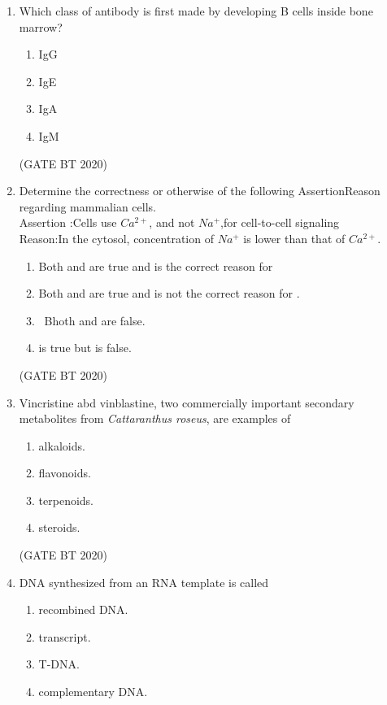 \documentclass[journal,12pt,onecolumn]{IEEEtran}
\theoremstyle{remark}
\begin{document}
\begin{enumerate}[label=Q\arabic*:]
\item Which class of antibody is first made by developing B cells inside bone marrow?
\begin{multicols}{4}
\begin{enumerate}
\item\;IgG
\item\;IgE
\item\;IgA
\item\;IgM
\end{enumerate}
\end{multicols}
\hfill(GATE BT 2020)

\item Determine the correctness or otherwise of the following AssertionReason regarding mammalian cells.\\
Assertion :Cells use $Ca^{2+}$, and not $Na^{+}$,for cell-to-cell signaling\\
Reason:In the cytosol, concentration of $Na^{+}$ is lower than that of $Ca^{2+}$.
\begin{multicols}{2}
\begin{enumerate}
\item\;Both  and  are true and  is the correct reason for
\item\;Both   and  are true and is not the correct reason for .
\item\ Bhoth   and  are false.
\item\; is true but  is  false.

\end{enumerate}
\end{multicols}
\hfill(GATE BT 2020)

\item Vincristine abd vinblastine, two commercially important secondary metabolites from \textit{Cattaranthus roseus}, are examples of
\begin{multicols}{4}
\begin{enumerate}
\item\;alkaloids.  
\item\;flavonoids.
\item\;terpenoids. 
\item\;steroids.

\end{enumerate} 
\end{multicols}
\hfill(GATE BT 2020)

\item DNA synthesized from an RNA template is called
\begin{multicols}{2}
\begin{enumerate}
\item\;recombined DNA. 
\item\;transcript.
\item\;T-DNA.
\item\;complementary DNA.


\end{enumerate}
\end{multicols}
\end{enumerate}
\end{document}
